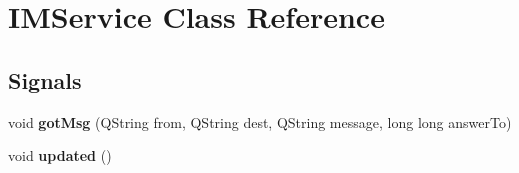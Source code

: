\hypertarget{classIMService}{
\section{IMService Class Reference}
\label{classIMService}
}
\subsection*{Signals}
\begin{DoxyCompactItemize}
\item 
\hypertarget{classIMService_a6f1b7156e1d847ecc8820730c26e70c2}{
void {\bfseries gotMsg} (QString from, QString dest, QString message, long long answerTo)}
\label{classIMService_a6f1b7156e1d847ecc8820730c26e70c2}

\item 
\hypertarget{classIMService_a6ea226e19be981791c8e511132ff99fe}{
void {\bfseries updated} ()}
\label{classIMService_a6ea226e19be981791c8e511132ff99fe}

\end{DoxyCompactItemize}
